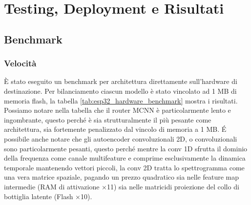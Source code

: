 \chapter{Testing, Deployment e Risultati}

\section{Benchmark}

\subsection{Velocità}
È stato eseguito un benchmark per architettura direttamente sull'hardware di destinazione. Per bilanciamento ciascun modello è stato vincolato ad 1 MB di memoria flash, la tabella \ref{tab:esp32_hardware_benchmark} mostra i risultati.
Possiamo notare nella tabella che il router MCNN è particolarmente lento e ingombrante, questo perché è sia strutturalmente il più pesante come architettura, sia fortemente penalizzato dal vincolo di memoria a 1 MB.
É possibile anche notare che gli autoencoder convoluzionali 2D, o convoluzionali sono particolarmente pesanti, questo perché mentre la conv 1D sfrutta il dominio della frequenza come canale multifeature e comprime esclusivamente la dinamica temporale mantenendo vettori piccoli, la conv 2D tratta lo spettrogramma come una vera matrice spaziale, pagando un prezzo quadratico sia nelle feature map intermedie (RAM di attivazione ×11) sia nelle matricidi proiezione del collo di bottiglia latente (Flash ×10).


